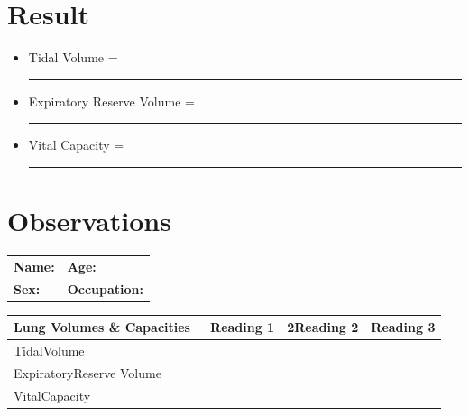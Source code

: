 \documentclass[a4paper,12pt]{book}
\begin{document}
															\section*{Result}
														\begin{itemize}
														\item[]	Tidal Volume						=\rule{5cm}{1mm}	
\item[]		Expiratory Reserve Volume				=\rule{5cm}{1mm}
\item[]			Vital Capacity						=\rule{5cm}{1mm}	
														\end{itemize}

														\section*{Observations}

															\begin{tabular}{p{5in} p{1in}}
																\textbf{Name:}  & \textbf{Age:}\\
																\textbf{Sex:}   & \textbf{Occupation:}
															\end{tabular}

\begin{table}[H]
\centering
\begin{tabular}{|l|l|l|l|} 
	\hline
	\textbf{Lung			Volumes \& Capacities}~							 &  \textbf{Reading			1} &  2\textbf{Reading			2} &  \textbf{Reading			3}  \\ 
	\hline
	TidalVolume                                   &                       &                        &                        \\ 
	\hline
	ExpiratoryReserve Volume                      &                       &                        &                        \\ 
	\hline
	VitalCapacity                                 &                       &                        &                        \\
	\hline
\end{tabular}
\end{table}
\end{document}
